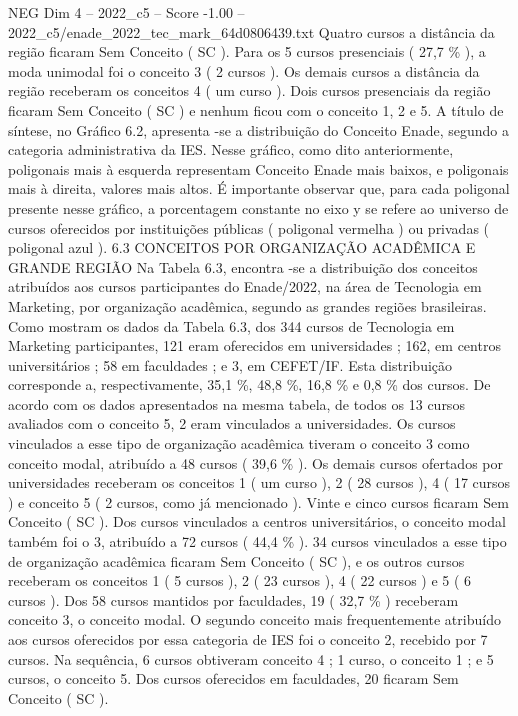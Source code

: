 \begin{textsample}{NEG Dim 4 – 2022\_c5 – Score -1.00 – 2022\_c5/enade\_2022\_tec\_mark\_64d0806439.txt}
Quatro cursos a distância da região ficaram Sem Conceito ( SC ).
Para os 5 cursos presenciais ( 27,7 \% ), a moda unimodal foi o conceito 3 ( 2 cursos ).
Os demais cursos a distância da região receberam os conceitos 4 ( um curso ).
Dois cursos presenciais da região ficaram Sem Conceito ( SC ) e nenhum ficou com o conceito 1, 2 e 5.
A título de síntese, no Gráfico 6.2, apresenta -se a distribuição do Conceito Enade, segundo a categoria administrativa da IES.
Nesse gráfico, como dito anteriormente, poligonais mais à esquerda representam Conceito Enade mais baixos, e poligonais mais à direita, valores mais altos.
É importante observar que, para cada poligonal presente nesse gráfico, a porcentagem constante no eixo y se refere ao universo de cursos oferecidos por instituições públicas ( poligonal vermelha ) ou privadas ( poligonal azul ). 6.3 CONCEITOS POR ORGANIZAÇÃO ACADÊMICA E GRANDE REGIÃO Na Tabela 6.3, encontra -se a distribuição dos conceitos atribuídos aos cursos participantes do Enade/2022, na área de Tecnologia em Marketing, por organização acadêmica, segundo as grandes regiões brasileiras.
Como mostram os dados da Tabela 6.3, dos 344 cursos de Tecnologia em Marketing participantes, 121 eram oferecidos em universidades ; 162, em centros universitários ; 58 em faculdades ; e 3, em CEFET/IF.
Esta distribuição corresponde a, respectivamente, 35,1 \%, 48,8 \%, 16,8 \% e 0,8 \% dos cursos.
De acordo com os dados apresentados na mesma tabela, de todos os 13 cursos avaliados com o conceito 5, 2 eram vinculados a universidades.
Os cursos vinculados a esse tipo de organização acadêmica tiveram o conceito 3 como conceito modal, atribuído a 48 cursos ( 39,6 \% ).
Os demais cursos ofertados por universidades receberam os conceitos 1 ( um curso ), 2 ( 28 cursos ), 4 ( 17 cursos ) e conceito 5 ( 2 cursos, como já mencionado ).
Vinte e cinco cursos ficaram Sem Conceito ( SC ).
Dos cursos vinculados a centros universitários, o conceito modal também foi o 3, atribuído a 72 cursos ( 44,4 \% ). 34 cursos vinculados a esse tipo de organização acadêmica ficaram Sem Conceito ( SC ), e os outros cursos receberam os conceitos 1 ( 5 cursos ), 2 ( 23 cursos ), 4 ( 22 cursos ) e 5 ( 6 cursos ).
Dos 58 cursos mantidos por faculdades, 19 ( 32,7 \% ) receberam conceito 3, o conceito modal.
O segundo conceito mais frequentemente atribuído aos cursos oferecidos por essa categoria de IES foi o conceito 2, recebido por 7 cursos.
Na sequência, 6 cursos obtiveram conceito 4 ; 1 curso, o conceito 1 ; e 5 cursos, o conceito 5.
Dos cursos oferecidos em faculdades, 20 ficaram Sem Conceito ( SC ).

\end{textsample}
